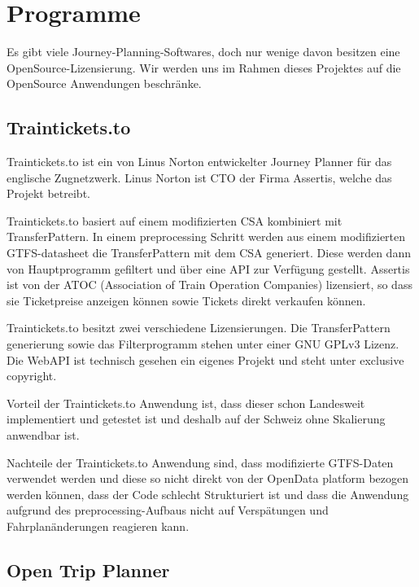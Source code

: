 \section[Programme]{Programme}
\label{sec:programme}

Es gibt viele Journey-Planning-Softwares, doch nur wenige davon besitzen eine OpenSource-Lizensierung. Wir werden uns im Rahmen dieses Projektes auf die OpenSource Anwendungen beschränke.

\subsection{Traintickets.to} 
\label{susec:Traintickets.to}

Traintickets.to ist ein von Linus Norton entwickelter Journey Planner für das englische Zugnetzwerk. Linus Norton ist CTO der Firma Assertis, welche das Projekt betreibt. \vspace{0.5cm}
	
Traintickets.to basiert auf einem modifizierten CSA kombiniert mit TransferPattern. In einem preprocessing Schritt werden aus einem modifizierten GTFS-datasheet die TransferPattern mit dem CSA generiert. Diese werden dann von Hauptprogramm gefiltert und über eine API zur Verfügung gestellt. Assertis ist von der ATOC (Association of Train Operation Companies) lizensiert, so dass sie Ticketpreise anzeigen können sowie Tickets direkt verkaufen können. \vspace{0.5cm}

Traintickets.to besitzt zwei verschiedene Lizensierungen. Die TransferPattern generierung sowie das Filterprogramm stehen unter einer GNU GPLv3 Lizenz. Die WebAPI ist technisch gesehen ein eigenes Projekt und steht unter exclusive copyright. \vspace{0.5cm}

Vorteil der Traintickets.to Anwendung ist, dass dieser schon Landesweit implementiert und getestet ist und deshalb auf der Schweiz ohne Skalierung anwendbar ist. \vspace{0.5cm}

Nachteile der Traintickets.to Anwendung sind, dass modifizierte GTFS-Daten verwendet werden und diese so nicht direkt von der OpenData platform bezogen werden können, dass der Code schlecht Strukturiert ist und dass die Anwendung aufgrund des preprocessing-Aufbaus nicht auf Verspätungen und Fahrplanänderungen reagieren kann.
     


\subsection{Open Trip Planner}
\label{subsec:OTP}

